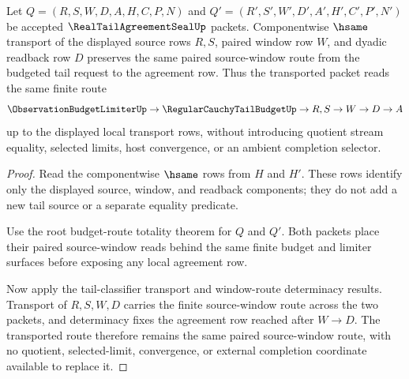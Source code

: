\begin{theorem}
\label{thm:real-tail-agreement-seal-root-source-window-transport}
Let $Q=(R,S,W,D,A,H,C,P,N)$ and $Q'=(R',S',W',D',A',H',C',P',N')$ be accepted $\RealTailAgreementSealUp$ packets. Componentwise $\hsame$ transport of the displayed source rows $R,S$, paired window row $W$, and dyadic readback row $D$ preserves the same paired source-window route from the budgeted tail request to the agreement row. Thus the transported packet reads the same finite route
$$
\ObservationBudgetLimiterUp \to \RegularCauchyTailBudgetUp \to R,S \to W \to D \to A
$$
up to the displayed local transport rows, without introducing quotient stream equality, selected limits, host convergence, or an ambient completion selector.
\end{theorem}
\begin{proof}
Read the componentwise $\hsame$ rows from $H$ and $H'$. These rows identify only the displayed source, window, and readback components; they do not add a new tail source or a separate equality predicate.

Use the root budget-route totality theorem for $Q$ and $Q'$. Both packets place their paired source-window reads behind the same finite budget and limiter surfaces before exposing any local agreement row.

Now apply the tail-classifier transport and window-route determinacy results. Transport of $R,S,W,D$ carries the finite source-window route across the two packets, and determinacy fixes the agreement row reached after $W \to D$. The transported route therefore remains the same paired source-window route, with no quotient, selected-limit, convergence, or external completion coordinate available to replace it.
\end{proof}

